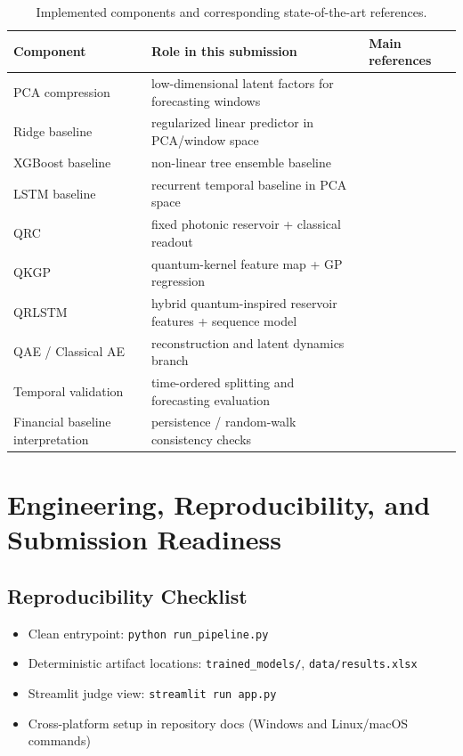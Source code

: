 \documentclass[11pt]{article}
\begin{document}
\begin{table}[H]
\centering
\caption{Implemented components and corresponding state-of-the-art references.}
\label{tab:sota_map}
\begin{tabular}{p{3.0cm}p{6.6cm}p{4.8cm}}
\toprule
Component & Role in this submission & Main references \\
\midrule
PCA compression & low-dimensional latent factors for forecasting windows & \cite{jolliffe2002pca} \\
Ridge baseline & regularized linear predictor in PCA/window space & \cite{hoerl1970ridge} \\
XGBoost baseline & non-linear tree ensemble baseline & \cite{chen2016xgboost} \\
LSTM baseline & recurrent temporal baseline in PCA space & \cite{hochreiter1997lstm} \\
QRC & fixed photonic reservoir + classical readout & \cite{jaeger2001echo,fujii2017quantumreservoir} \\
QKGP & quantum-kernel feature map + GP regression & \cite{havlicek2019supervised,schuld2019feature,schuld2021kernel,rasmussen2006gp} \\
QRLSTM & hybrid quantum-inspired reservoir features + sequence model & \cite{fujii2017quantumreservoir,hochreiter1997lstm} \\
QAE / Classical AE & reconstruction and latent dynamics branch & \cite{romero2017qae,hinton2006reducing} \\
Temporal validation & time-ordered splitting and forecasting evaluation & \cite{bergmeir2018crossval} \\
Financial baseline interpretation & persistence / random-walk consistency checks & \cite{fama1970efficient,diebold2006yield,brace1997market} \\
\bottomrule
\end{tabular}
\end{table}

\section{Engineering, Reproducibility, and Submission Readiness}
\subsection{Reproducibility Checklist}
\begin{itemize}[leftmargin=1.4em]
  \item Clean entrypoint: \texttt{python run\_pipeline.py}
  \item Deterministic artifact locations: \texttt{trained\_models/}, \texttt{data/results.xlsx}
  \item Streamlit judge view: \texttt{streamlit run app.py}
  \item Cross-platform setup in repository docs (Windows and Linux/macOS commands)
\end{itemize}
\end{document}
